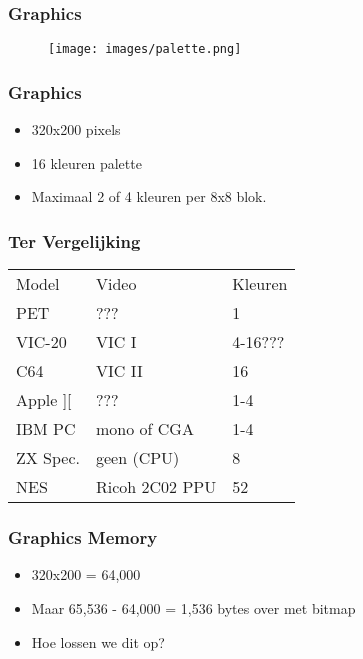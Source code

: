 \begin{frame}
\frametitle{Graphics}

\begin{figure}
\texttt{[image: images/palette.png]}
\end{figure}

\end{frame}


\begin{frame}
\frametitle{Graphics}

\begin{itemize}
\item 320x200 pixels
\item 16 kleuren palette
\item Maximaal 2 of 4 kleuren per 8x8 blok.
\end{itemize}

\end{frame}


\begin{frame}
\frametitle{Ter Vergelijking}

\begin{tabular}{|l|l|l|}
\hline Model & Video & Kleuren \\
PET & ??? & 1 \\
VIC-20 & VIC I & 4-16??? \\
C64 & VIC II & 16 \\
Apple ][ & ??? & 1-4 \\
IBM PC & mono of CGA & 1-4 \\
ZX Spec. & geen (CPU) & 8 \\ \hline
NES & Ricoh 2C02 PPU & 52 \\ \hline
\end{tabular}

\end{frame}


\begin{frame}
\frametitle{Graphics Memory}

\begin{itemize}
\item 320x200 = 64,000
\item Maar 65,536 - 64,000 = 1,536 bytes over met bitmap
\item Hoe lossen we dit op?
\end{itemize}

\end{frame}

